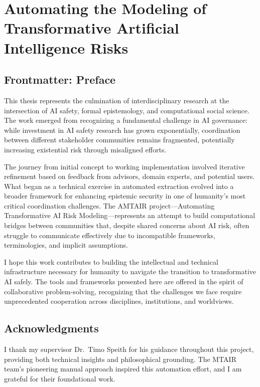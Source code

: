 \documentclass[
  11pt,
  letterpaper,
]{book}
\begin{document}

\chapter{Automating the Modeling of Transformative Artificial
Intelligence
Risks}\label{automating-the-modeling-of-transformative-artificial-intelligence-risks}

\section{Frontmatter: Preface}\label{frontmatter-preface}

This thesis represents the culmination of interdisciplinary research at
the intersection of AI safety, formal epistemology, and computational
social science. The work emerged from recognizing a fundamental
challenge in AI governance: while investment in AI safety research has
grown exponentially, coordination between different stakeholder
communities remains fragmented, potentially increasing existential risk
through misaligned efforts.

The journey from initial concept to working implementation involved
iterative refinement based on feedback from advisors, domain experts,
and potential users. What began as a technical exercise in automated
extraction evolved into a broader framework for enhancing epistemic
security in one of humanity's most critical coordination challenges. The
AMTAIR project---Automating Transformative AI Risk Modeling---represents
an attempt to build computational bridges between communities that,
despite shared concerns about AI risk, often struggle to communicate
effectively due to incompatible frameworks, terminologies, and implicit
assumptions.

I hope this work contributes to building the intellectual and technical
infrastructure necessary for humanity to navigate the transition to
transformative AI safely. The tools and frameworks presented here are
offered in the spirit of collaborative problem-solving, recognizing that
the challenges we face require unprecedented cooperation across
disciplines, institutions, and worldviews.

\section{Acknowledgments}\label{acknowledgments}

I thank my supervisor Dr.~Timo Speith for his guidance throughout this
project, providing both technical insights and philosophical grounding.
The MTAIR team's pioneering manual approach inspired this automation
effort, and I am grateful for their foundational work.
\end{document}
